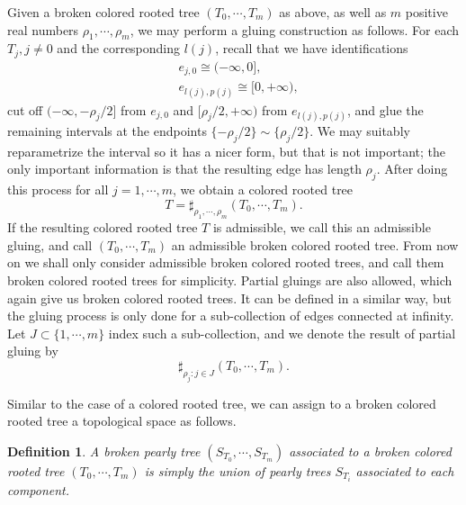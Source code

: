\documentclass{amsart}
\newtheorem{definition}[theorem]{Definition}
\numberwithin{equation}{section}
\numberwithin{figure}{section}
\begin{document}
	Given a broken colored rooted tree $(T_{0}, \cdots, T_{m})$ as above, as well as $m$ positive real numbers $\rho_{1}, \cdots, \rho_{m}$, we may perform a gluing construction as follows. For each $T_{j}, j \neq 0$ and the corresponding $l(j)$, recall that we have identifications
\begin{equation}
\begin{split}
&e_{j, 0} \cong (-\infty, 0],\\
&e_{l(j), p(j)} \cong [0, +\infty),
\end{split}
\end{equation}
cut off $(-\infty, -\rho_{j}/2]$ from $e_{j, 0}$ and $[\rho_{j}/2, +\infty)$ from $e_{l(j), p(j)}$, and glue the remaining intervals at the endpoints $\{-\rho_{j}/2\} \sim \{\rho_{j}/2\}$. We may suitably reparametrize the interval so it has a nicer form, but that is not important; the only important information is that the resulting edge has length $\rho_{j}$. After doing this process for all $j = 1, \cdots, m$, we obtain a colored rooted tree
\begin{equation}
T = \sharp_{\rho_{1}, \cdots, \rho_{m}}(T_{0}, \cdots, T_{m}).
\end{equation}
If the resulting colored rooted tree $T$ is admissible, we call this an admissible gluing, and call $(T_{0}, \cdots, T_{m})$ an admissible broken colored rooted tree. From now on we shall only consider admissible broken colored rooted trees, and call them broken colored rooted trees for simplicity. Partial gluings are also allowed, which again give us broken colored rooted trees. It can be defined in a similar way, but the gluing process is only done for a sub-collection of edges connected at infinity. Let $J \subset \{1, \cdots, m\}$ index such a sub-collection, and we denote the result of partial gluing by
\begin{equation}
\sharp_{\rho_{j}: j \in J}(T_{0}, \cdots, T_{m}).
\end{equation}\par
	Similar to the case of a colored rooted tree, we can assign to a broken colored rooted tree a topological space as follows. \par

\begin{definition}
	A broken pearly tree $(S_{T_{0}}, \cdots, S_{T_{m}})$ associated to a broken colored rooted tree $(T_{0}, \cdots, T_{m})$ is simply the union of pearly trees $S_{T_{i}}$ associated to each component.
\end{definition}
\end{document}
